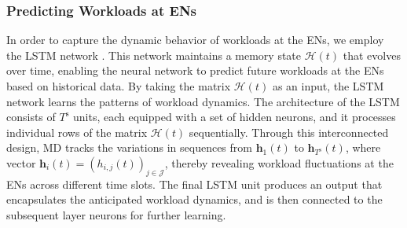 \documentclass[10pt, journal,letterpaper]{IEEEtran}
\begin{document}
\subsubsection{Predicting Workloads at ENs}
In order to capture the dynamic behavior of workloads at the ENs, we employ the LSTM network \cite{hochreiter1997long}. This network maintains a memory state $\mathcal{H}(t)$ that evolves over time, enabling the neural network to predict future workloads at the ENs based on historical data. By taking the matrix $\mathcal{H}(t)$ as an input, the LSTM network learns the patterns of workload dynamics. The architecture of the LSTM consists of $T^{\text{s}}$ units, each equipped with a set of hidden neurons, and it processes individual rows of the matrix $\mathcal{H}(t)$ sequentially. Through this interconnected design, MD tracks the variations in sequences from $\boldsymbol{h}_1(t)$ to $\boldsymbol{h}_{T^{\text{s}}}(t)$, where vector $\boldsymbol{h}_i(t) = (h_{i,j}(t))_{j \in \mathcal{J}}$, thereby revealing workload fluctuations at the ENs across different time slots. The final LSTM unit produces an output that encapsulates the anticipated workload dynamics, and is then connected to the subsequent layer neurons for further learning.




%
\end{document}
